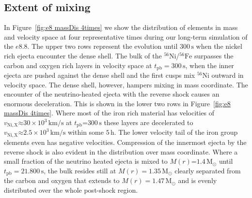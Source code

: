 \documentclass[fleqn,usenatbib]{mnras}
\newcommand{\nickel}{\ensuremath{\mathrm{^{56}Ni}}\xspace}
\newcommand{\iron}{\ensuremath{\mathrm{^{56}Fe}}\xspace}
\newcommand{\s}{\ensuremath{\text{s}}}
\begin{document}
\subsection{Extent of mixing}
In Figure~\ref{fig:e8 massDis 4times} we show the distribution of elements in mass and velocity space at four representative times during our long-term simulation of the $e8.8$. The upper two rows represent the evolution until $300\,\text{s}$ when the nickel rich ejecta encounter the dense shell.
The bulk of the \nickel/\iron surpasses the carbon and oxygen rich layers in velocity space at $t_{\mathrm{pb}}=300\,\text{s}$, when the inner ejecta are pushed against the dense shell and the first cusps mix \nickel outward in velocity space. The dense shell, however, hampers mixing in mass coordinate.
The encounter of the neutrino-heated ejecta with the reverse shock causes an enormous deceleration. This is shown in the lower two rows in Figure~\ref{fig:e8 massDis 4times}. Where most of the iron rich material has velocities of $v_{\mathrm{Ni,X}}\mathord{\approx} 30\times10^3 \,\mathrm{km/s}$ at $t_{\mathrm{pb}}\mathord{=}300\,\text{s}$ these layers are decelerated to $v_{\mathrm{Ni,X}}\mathord{\approx} 2.5\times 10^3\,\mathrm{km/s}$ within some $5 \,\mathrm{h}$. The lower velocity tail of the iron group elements even has negative velocities. 
Compression of the innermost ejecta by the reverse shock is also evident in the distribution over mass coordinate. Where a small fraction of the neutrino heated ejecta is mixed to $M(r)\mathord{=}1.4\,\mathrm{M_{\odot}}$ until $t_{\mathrm{pb}}=21.800\,\s$, the bulk resides still at  $M(r)=1.35\,\mathrm{M_{\odot}}$ clearly separated from the carbon and oxygen that extends to $M(r)=1.47\,\mathrm{M_{\odot}}$ and is evenly distributed over the whole post-shock region.
\end{document}
